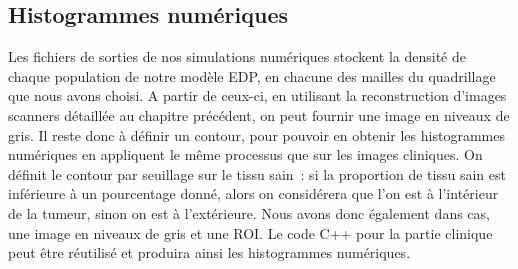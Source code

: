 \documentclass[main.tex]{subfiles}
\begin{document}
\subsection{Histogrammes numériques}
Les fichiers de sorties de nos simulations numériques stockent la densité de chaque population de notre modèle EDP, en chacune des mailles du quadrillage que nous avons choisi. 
A partir de ceux-ci, en utilisant la reconstruction d'images scanners détaillée au chapitre précédent, on peut fournir une image en niveaux de gris. Il reste donc à définir un contour, pour pouvoir en obtenir les histogrammes numériques en appliquent le même processus que sur les images cliniques. 
On définit le contour par seuillage sur le tissu sain~: 
si la proportion de tissu sain est inférieure à un pourcentage donné, alors on considérera que l'on est à l'intérieur de la tumeur, sinon on est à l'extérieure. Nous avons donc également dans cas, une image en niveaux de gris et une ROI. Le code C++ pour la partie clinique peut être réutilisé et produira ainsi les histogrammes numériques.
\end{document}
